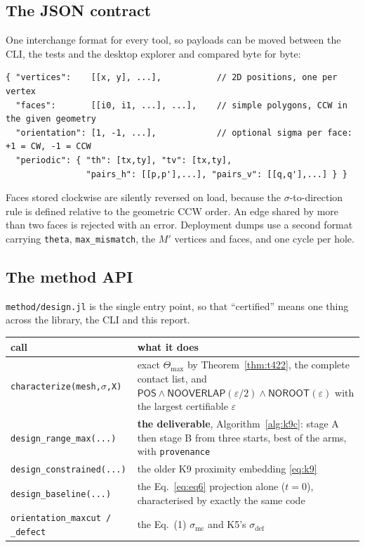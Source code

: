 \documentclass[11pt,a4paper]{article}
\theoremstyle{definition}
\newcommand{\Tmax}{\Theta_{\max}}
\newcommand{\Mprime}{M'}
\newcommand{\file}[1]{\texttt{\small #1}}
\newcommand{\POS}{\textsf{POS}}
\newcommand{\NOOV}{\textsf{NOOVERLAP}}
\newcommand{\NOROOT}{\textsf{NOROOT}}
\begin{document}
\subsection{The JSON contract}

One interchange format for every tool, so payloads can be moved between the CLI, the tests and
the desktop explorer and compared byte for byte:

\begin{verbatim}
{ "vertices":    [[x, y], ...],           // 2D positions, one per vertex
  "faces":       [[i0, i1, ...], ...],    // simple polygons, CCW in the given geometry
  "orientation": [1, -1, ...],            // optional sigma per face: +1 = CW, -1 = CCW
  "periodic": { "th": [tx,ty], "tv": [tx,ty],
                "pairs_h": [[p,p'],...], "pairs_v": [[q,q'],...] } }
\end{verbatim}

\noindent Faces stored clockwise are silently reversed on load, because the
$\sigma$-to-direction rule is defined relative to the geometric CCW order. An edge shared by
more than two faces is rejected with an error. Deployment dumps use a second format carrying
\texttt{theta}, \texttt{max\_mismatch}, the $\Mprime$ vertices and faces, and one cycle per
hole.

\subsection{The method API}

\file{method/design.jl} is the single entry point, so that ``certified'' means one thing
across the library, the CLI and this report.

\begin{center}
\small
\begin{tabular}{@{}p{}p{}@{}}
\toprule
call & what it does \\
\midrule
\file{characterize(mesh,$\sigma$,X)} & exact $\Tmax$ by Theorem~\ref{thm:t422}, the complete contact list, and $\POS\wedge\NOOV(\varepsilon/2)\wedge\NOROOT(\varepsilon)$ with the largest certifiable $\varepsilon$ \\
\file{design\_range\_max(...)} & \textbf{the deliverable}, Algorithm~\ref{alg:k9c}: stage A then stage B from three starts, best of the arms, with \texttt{provenance} \\
\file{design\_constrained(...)} & the older K9 proximity embedding \eqref{eq:k9} \\
\file{design\_baseline(...)} & the Eq.~\eqref{eq:eq6} projection alone ($t=0$), characterised by exactly the same code \\
\file{orientation\_maxcut / \_defect} & the Eq.~(1) $\sigma_{\mathrm{mc}}$ and K5's $\sigma_{\mathrm{def}}$ \\
\bottomrule
\end{tabular}
\end{center}
\end{document}
